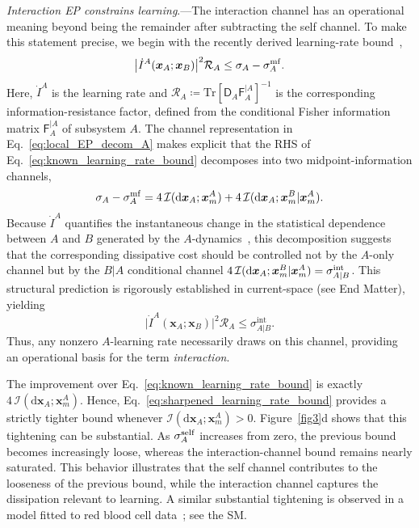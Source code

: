 \documentclass[
 longbibliography,
 twocolumn,
 superscriptaddress,
 amsmath,
 amssymb,
 amsthm,
 amsfonts,
 prl,
 floatfix,
]{revtex4-2}
\newcommand{\matbf}[1]{\boldsymbol{\mathsf{#1}}}
\begin{document}
\textit{Interaction EP constrains learning}.---The interaction channel has an operational meaning beyond being the
remainder after subtracting the self channel. To make this statement precise, we begin with the recently derived learning-rate bound~\cite{matsumoto2025learningrate},
\begin{equation}
    \big|\dot I^A(\bm x_A;\bm x_B)\big|^2\mathcal R_A\le
    \sigma_A-\sigma_A^{\rm mf}.
    \label{eq:known_learning_rate_bound}
\end{equation}
Here, $\dot I^A$ is the learning rate and $\mathcal R_A\coloneq\mathrm{Tr}[\matbf D_A\matbf F_A^{|A}]^{-1}$ is the corresponding information-resistance factor, defined from the conditional Fisher information matrix $\matbf F_A^{|A}$ of subsystem $A$.
The channel representation in Eq.~\eqref{eq:local_EP_decom_A} makes explicit that the RHS of Eq.~\eqref{eq:known_learning_rate_bound} decomposes into two midpoint-information channels,
\[
    \sigma_A-\sigma_A^{\rm mf}=4\,\mathcal I(\mathrm d\bm x_A;\bm x_m^A)+4\,\mathcal I(\mathrm d\bm x_A;\bm x_m^B|\bm x_m^A).
\]
Because $\dot I^A$ quantifies the instantaneous change in the statistical dependence between $A$ and $B$ generated by the $A$-dynamics~\cite{horowitz2014thermodynamics,barato2014efficiency}, this decomposition suggests that the corresponding dissipative cost should be controlled not by the $A$-only channel but by the $B|A$ conditional channel $4\,\mathcal I(\mathrm d\bm x_A;\bm x_m^B|\bm x_m^A)=\sigma_{A|B}^{\rm int}$. This structural prediction is rigorously established in current-space (see End Matter), yielding
\begin{equation}
    \big|\dot I^A(\bm x_A;\bm x_B)\big|^2\mathcal R_A\le
    \sigma_{A|B}^{\mathrm{int}}.
    \label{eq:sharpened_learning_rate_bound}
\end{equation}
Thus, any nonzero $A$-learning rate necessarily draws on this channel, providing an operational basis for the term \textit{interaction}.

The improvement over Eq.~\eqref{eq:known_learning_rate_bound} is exactly $4\,\mathcal I(\mathrm d\bm x_A;\bm x_m^A)$. Hence, Eq.~\eqref{eq:sharpened_learning_rate_bound} provides a strictly tighter bound whenever $\mathcal I(\mathrm d\bm x_A;\bm x_m^A)>0$.
Figure~\ref{fig3}d shows that this tightening can be substantial. As $\sigma_A^{\rm self}$ increases from zero, the previous bound becomes increasingly loose, whereas the interaction-channel bound remains nearly saturated. This behavior illustrates that the self channel contributes to the looseness of the previous bound, while the interaction channel captures the dissipation relevant to learning. A similar substantial tightening is observed in a model fitted to red blood cell data~\cite{terlizzi2024variance}; see the SM.
\end{document}
